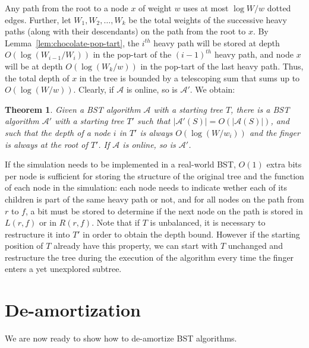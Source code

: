 \documentclass[11pt]{article}
\newtheorem{theorem}{Theorem}
\def\A{{\mathcal{A}}}
\begin{document}
Any path from the root to a node $x$ of weight $w$ uses at most $\log{W/w}$
dotted edges. Further, let $W_1, W_2, \ldots, W_k$ be the total weights of
the successive heavy paths (along with their descendants) on the path from
the root to $x$. By Lemma~\ref{lem:chocolate-pop-tart}, the $i^{th}$ heavy
path will be stored at depth $O(\log(W_{i-1}/W_i))$ in the pop-tart of the
$(i-1)^{th}$ heavy path, and node $x$ will be at depth $O(\log(W_{k}/w))$
in the pop-tart of the last heavy path.  Thus, the total depth of $x$ in
the tree is bounded by a telescoping sum that sums up to $O(\log(W/w))$.
Clearly, if $\A$ is online, so is $\A'$. We obtain:

\begin{theorem}\label{thm:simulation}
Given a BST algorithm $\A$ with a starting tree $T$, there is a BST
algorithm $\A'$ with a starting tree $T'$ such that $|\A'(S)| =
O(|\A(S)|)$,
and such that the depth of a node $i$ in $T'$ is always $O(\log (W/w_i))$
and the finger is always at the root of $T'$. If $\A$ is online, so is
$\A'$.
\end{theorem}

If the simulation needs to be implemented in a real-world BST, $O(1)$ extra
bits per node is sufficient for storing the structure of
the original tree and the function of each node in the simulation:
each node needs to indicate wether each of its 
children is part of the same heavy path or not, and for all nodes on
the path from $r$ to $f$, a bit must be stored to determine if the
next node on the path is stored in $L(r,f)$ or in $R(r,f)$.
Note that if $T$ is unbalanced, it is necessary to restructure it into
$T'$ in order to obtain the depth bound. However if the starting
position of $T$ already have this property, we can start with
$T$ unchanged and restructure the tree
during the execution of the algorithm every time the finger enters a
yet unexplored subtree.

\section{De-amortization}\label{sec:de-amortization}
We are now ready to show how to de-amortize BST algorithms.
\end{document}
